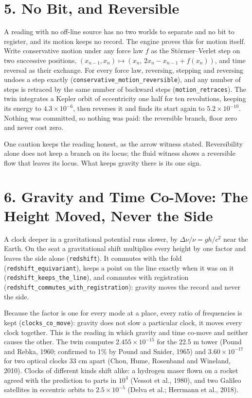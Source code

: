 \documentclass[10pt]{article}
\begin{document}
\hypertarget{no-bit-and-reversible}{%
\section{5. No Bit, and Reversible}\label{no-bit-and-reversible}}

A reading with no off-line source has no two worlds to separate and no
bit to register, and its motion keeps no record. The engine proves this
for motion itself. Write conservative motion under any force law \(f\)
as the Störmer--Verlet step on two successive positions,
\((x_{n-1},x_n)\mapsto(x_n,\,2x_n-x_{n-1}+f(x_n))\), and time reversal
as their exchange. For every force law, reversing, stepping and
reversing undoes a step exactly
(\texttt{conservative\_motion\_reversible}), and any number of steps is
retraced by the same number of backward steps
(\texttt{motion\_retraces}). The twin integrates a Kepler orbit of
eccentricity one half for ten revolutions, keeping its energy to
\(4.3\times10^{-6}\), then reverses it and finds its start again to
\(5.2\times10^{-10}\). Nothing was committed, so nothing was paid: the
reversible branch, floor zero and never cost zero.

One caution keeps the reading honest, as the arrow witness stated.
Reversibility alone does not keep a branch on its locus; the fluid
witness shows a reversible flow that leaves its locus. What keeps
gravity there is its one sign.

\hypertarget{gravity-and-time-co-move-the-height-moved-never-the-side}{%
\section{6. Gravity and Time Co-Move: The Height Moved, Never the
Side}\label{gravity-and-time-co-move-the-height-moved-never-the-side}}

A clock deeper in a gravitational potential runs slower, by
\(\Delta\nu/\nu=gh/c^2\) near the Earth. On the seat a gravitational
shift multiplies every height by one factor and leaves the side alone
(\texttt{redshift}). It commutes with the fold
(\texttt{redshift\_equivariant}), keeps a point on the line exactly when
it was on it (\texttt{redshift\_keeps\_the\_line}), and commutes with
registration (\texttt{redshift\_commutes\_with\_registration}): gravity
moves the record and never the side.

Because the factor is one for every mode at a place, every ratio of
frequencies is kept (\texttt{clocks\_co\_move}): gravity does not slow a
particular clock, it moves every clock together. This is the reading in
which gravity and time co-move and neither causes the other. The twin
computes \(2.455\times10^{-15}\) for the 22.5 m tower (Pound and Rebka,
1960; confirmed to 1\% by Pound and Snider, 1965) and
\(3.60\times10^{-17}\) for two optical clocks 33 cm apart (Chou, Hume,
Rosenband and Wineland, 2010). Clocks of different kinds shift alike: a
hydrogen maser flown on a rocket agreed with the prediction to parts in
\(10^4\) (Vessot et al., 1980), and two Galileo satellites in eccentric
orbits to \(2.5\times10^{-5}\) (Delva et al.; Herrmann et al., 2018).
\end{document}
